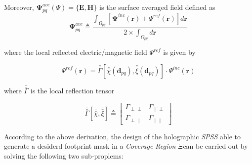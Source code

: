 Moreover, $\mathbf{\Psi}_{pq}^{ave}(\Psi)=\{\mathbf{E},\mathbf{H}\}$
is the surface averaged field defined as\begin{equation}
\mathbf{\Psi}_{pq}^{ave}\triangleq\frac{\int_{\Omega_{pq}}[\mathbf{\Psi}^{inc}(\mathbf{r})+\Psi^{ref}(\mathbf{r})]d\mathbf{r}}{2\times\int_{\Omega_{pq}}d\mathbf{r}}\label{eq:12}\end{equation}


where the local reflected electric/magnetic field $\Psi^{ref}$ is
given by

\begin{equation}
\Psi^{ref}(\mathbf{r})=\bar{\bar{\Gamma}}[\bar{\bar{\chi}}(\mathbf{d}_{pq}),\bar{\bar{\xi}}(\mathbf{d}_{pq})]\cdot\Psi^{inc}(\mathbf{r})\label{eq:13}\end{equation}


where $\bar{\bar{\Gamma}}$ is the local reflection tensor

\begin{equation}
\bar{\bar{\Gamma}}[\bar{\bar{\chi}},\bar{\bar{\xi}}]\triangleq\left[\begin{array}{cc}
\Gamma_{\perp\perp} & \Gamma_{\parallel\perp}\\
\Gamma_{\perp\parallel} & \Gamma_{\parallel\parallel}\end{array}\right]\label{eq:14}\end{equation}


According to the above derivation, the design of the holographic \emph{SPSS}
able to generate a desiderd footprint mask in a \emph{Coverage Region}
$\Xi$can be carried out by solving the following two sub-proplems:

